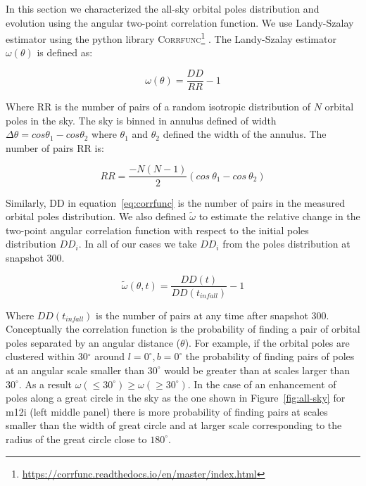 \documentclass{aastex63}
\begin{document}

In this section we characterized the all-sky orbital poles distribution and evolution using 
the angular two-point correlation function. We use Landy-Szalay estimator \citep{LandySzalay} using the python library \textsc{Corrfunc}\footnote{\href{https://corrfunc.readthedocs.io/en/master/index.html}{https://corrfunc.readthedocs.io/en/master/index.html}} \citep{corrfunc, 10.1007/978-981-13-7729-7_1}. The Landy-Szalay estimator $\omega (\theta)$ is defined as:   

\begin{equation}
    \omega(\theta) = \frac{DD}{RR} -1 
\end{equation}\label{eq:corrfunc}

Where RR is the number of pairs of a random isotropic distribution of $N$ orbital poles in the sky. The sky is binned in annulus defined of width $\Delta \theta = cos \theta_1 - cos \theta_2$ where $\theta_1$ and $\theta_2$ defined the width of the annulus. The number of pairs RR is: 

\begin{equation}
    RR = \frac{-N (N-1)}{2} (cos\ \theta_1 - cos\ \theta_2)
\end{equation}

Similarly, DD in equation~\ref{eq:corrfunc} is the number of pairs in the measured orbital poles distribution. We also defined $\tilde{\omega}$ to estimate the relative change in the two-point angular correlation function with respect to the initial poles distribution $DD_i$. In all of our cases we take $DD_i$ from the poles distribution at snapshot 300. 

\begin{equation}
    \tilde{\omega}(\theta, t) = \frac{DD(t)}{DD(t_{infall})} - 1 
\end{equation}\label{eq:corrfunc}


Where $DD(t_{infall})$ is the number of pairs at any time after snapshot 300. Conceptually the correlation function is the probability of finding a pair of orbital poles separated by an angular distance ($\theta$). For example, if the orbital poles are clustered within 30$^{\circ}$ around $l=0^{\circ}, b=0^{\circ}$ the probability of finding pairs of poles at an angular scale smaller than $30^{\circ}$ would be greater than at scales larger than $30^{\circ}$. As a result $\omega(\leq  30^{\circ}) \geq \omega(\geq 30^{\circ})$. In the case of an enhancement of poles along a great circle in the sky as the one shown in Figure~\ref{fig:all-sky} for m12i (left middle panel) there is more probability of finding pairs at scales smaller than the width of great circle and at larger scale corresponding to the radius of the great circle close to $180^{\circ}$. 
\end{document}
